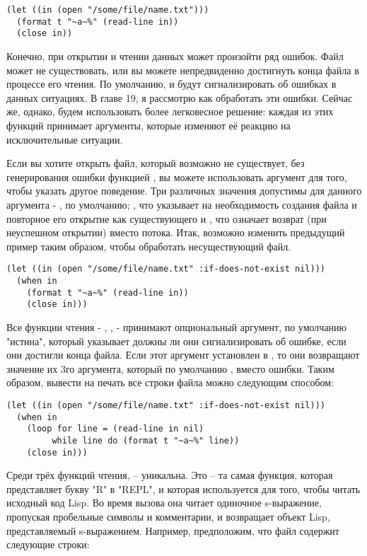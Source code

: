 \begin{lstlisting}
(let ((in (open "/some/file/name.txt")))
  (format t "~a~%" (read-line in))
  (close in))
\end{lstlisting}

Конечно, при открытии и чтении данных может произойти ряд ошибок. Файл может не
существовать, или вы можете непредвиденно достигнуть конца файла в процессе его чтения. По
умолчанию,  и  будут сигнализировать об ошибках в данных
ситуациях. В главе 19, я рассмотрю как обработать эти ошибки. Сейчас же, однако, будем
использовать более легковесное решение: каждая из этих функций принимает аргументы,
которые изменяют её реакцию на исключительные ситуации.

Если вы хотите открыть файл, который возможно не существует, без генерирования ошибки
функцией , вы можете использовать аргумент  для того,
чтобы указать другое поведение. Три различных значения допустимы для данного аргумента -
, по умолчанию; , что указывает на необходимость создания файла
и повторное его открытие как существующего и , что означает возврат 
(при неуспешном открытии) вместо потока. Итак, возможно изменить предыдущий пример таким
образом, чтобы обработать несуществующий файл.

\begin{lstlisting}
(let ((in (open "/some/file/name.txt" :if-does-not-exist nil)))
  (when in
    (format t "~a~%" (read-line in))
    (close in)))
\end{lstlisting}

Все функции чтения - , ,  - принимают
опциональный аргумент, по умолчанию "истина", который указывает должны ли они
сигнализировать об ошибке, если они достигли конца файла. Если этот аргумент установлен в
, то они возвращают значение их 3го аргумента, который по умолчанию ,
вместо ошибки. Таким образом, вывести на печать все строки файла можно следующим способом:

\begin{lstlisting}
(let ((in (open "/some/file/name.txt" :if-does-not-exist nil)))
  (when in
    (loop for line = (read-line in nil)
         while line do (format t "~a~%" line))
    (close in)))
\end{lstlisting}

Среди трёх функций чтения,  -- уникальна. Это -- та самая функция, которая
представляет букву "R" в "REPL", и которая используется для того, чтобы читать исходный
код Lisp. Во время вызова она читает одиночное s-выражение, пропуская пробельные символы и
комментарии, и возвращает объект Lisp, представляемый s-выражением. Например, предположим,
что файл  содержит следующие строки:

